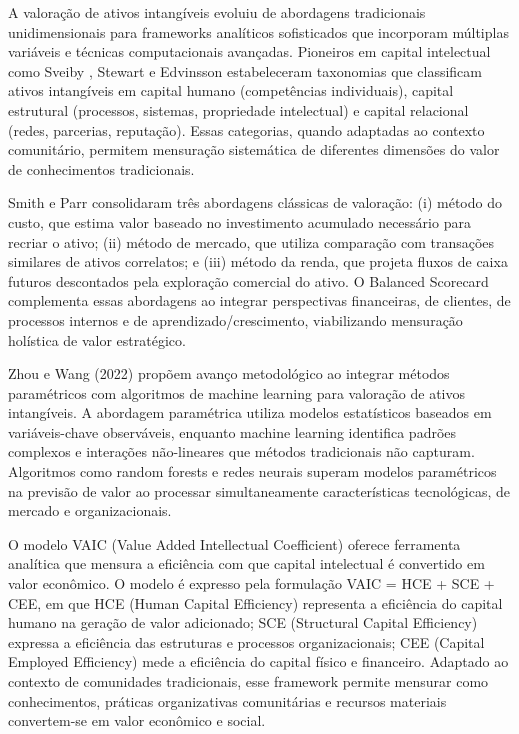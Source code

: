 A valoração de ativos intangíveis evoluiu de abordagens tradicionais unidimensionais \cite{SmithParr2000} para frameworks analíticos sofisticados que incorporam múltiplas variáveis e técnicas computacionais avançadas. Pioneiros em capital intelectual como Sveiby \cite{Sveiby1997}, Stewart \cite{Stewart1997} e Edvinsson \cite{Edvinsson1997} estabeleceram taxonomias que classificam ativos intangíveis em capital humano (competências individuais), capital estrutural (processos, sistemas, propriedade intelectual) e capital relacional (redes, parcerias, reputação). Essas categorias, quando adaptadas ao contexto comunitário, permitem mensuração sistemática de diferentes dimensões do valor de conhecimentos tradicionais.

Smith e Parr \cite{SmithParr2000} consolidaram três abordagens clássicas de valoração: (i) método do custo, que estima valor baseado no investimento acumulado necessário para recriar o ativo; (ii) método de mercado, que utiliza comparação com transações similares de ativos correlatos; e (iii) método da renda, que projeta fluxos de caixa futuros descontados pela exploração comercial do ativo. O Balanced Scorecard \cite{Kaplan1996} complementa essas abordagens ao integrar perspectivas financeiras, de clientes, de processos internos e de aprendizado/crescimento, viabilizando mensuração holística de valor estratégico.

Zhou e Wang (2022) propõem avanço metodológico ao integrar métodos paramétricos com algoritmos de machine learning para valoração de ativos intangíveis. A abordagem paramétrica utiliza modelos estatísticos baseados em variáveis-chave observáveis, enquanto machine learning identifica padrões complexos e interações não-lineares que métodos tradicionais não capturam. Algoritmos como random forests e redes neurais superam modelos paramétricos na previsão de valor ao processar simultaneamente características tecnológicas, de mercado e organizacionais.

O modelo VAIC (Value Added Intellectual Coefficient) \cite{Pulic2000} oferece ferramenta analítica que mensura a eficiência com que capital intelectual é convertido em valor econômico. O modelo é expresso pela formulação VAIC = HCE + SCE + CEE, em que HCE (Human Capital Efficiency) representa a eficiência do capital humano na geração de valor adicionado; SCE (Structural Capital Efficiency) expressa a eficiência das estruturas e processos organizacionais; CEE (Capital Employed Efficiency) mede a eficiência do capital físico e financeiro. Adaptado ao contexto de comunidades tradicionais, esse framework permite mensurar como conhecimentos, práticas organizativas comunitárias e recursos materiais convertem-se em valor econômico e social.

